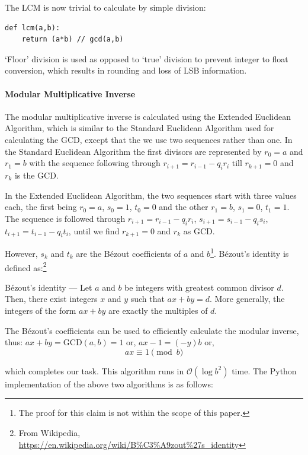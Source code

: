 \documentclass{article}
\begin{document}
The LCM is now trivial to calculate by simple division:

\begin{verbatim}
def lcm(a,b):
    return (a*b) // gcd(a,b)
\end{verbatim}

`Floor' division is used as opposed to `true' division to prevent integer to float conversion, which
results in rounding and loss of LSB information.

\paragraph{Modular Multiplicative Inverse}
The modular multiplicative inverse is calculated using the Extended Euclidean Algorithm, which is
similar to the Standard Euclidean Algorithm used for calculating the GCD, except that the we use two
sequences rather than one. In the Standard Euclidean Algorithm the first divisors are represented
by $r_0 = a$ and $r_1 = b$ with the sequence following through $r_{i+1}=r_{i-1}-q_i r_i$ till
$r_{k+1} = 0$ and $r_k$ is the GCD.

In the Extended Euclidean Algorithm, the two sequences start with three values each, the first being
$r_0 = a$, $s_0 = 1$, $t_0 = 0$ and the other $r_1= b$, $s_1=0$, $t_1 = 1$. The sequence is followed
through $r_{i+1}=r_{i-1}-q_i r_i$, $s_{i+1}=s_{i-1}-q_i s_i$, $t_{i+1}=t_{i-1}-q_i t_i$, until we
find $r_{k+1} = 0$ and $r_k$ as GCD.

However, $s_k$ and $t_k$ are the Bézout coefficients of $a$ and $b$\footnote{The proof for this
claim is not within the scope of this paper.}. Bézout's identity is defined as:\footnote{From
Wikipedia, \url{https://en.wikipedia.org/wiki/B\%C3\%A9zout\%27s_identity}}

\begin{displayquote}
Bézout's identity — Let $a$ and $b$ be integers with greatest common divisor $d$. Then, there exist
integers $x$ and $y$ such that $ax + by = d$. More generally, the integers of the form $ax + by$ are
exactly the multiples of $d$.
\end{displayquote}
The Bézout's coefficients can be used to efficiently calculate the modular inverse, thus:
$ax + by = \mathrm{GCD}(a, b) = 1$ or, $ax - 1 = (-y)b$ or, $$ax \equiv 1 \pmod{b}$$

which completes our task. This algorithm runs in $\mathcal{O}(\log{b^2})$ time. The Python
implementation of the above two algorithms is as follows:
\end{document}
